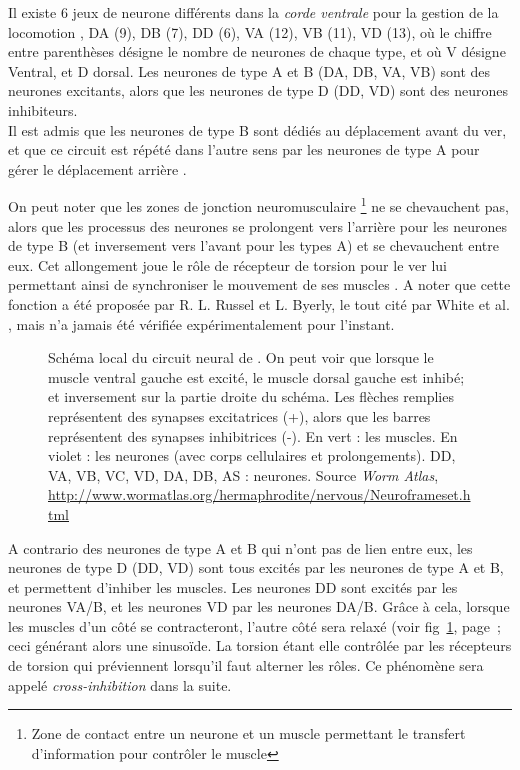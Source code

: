 Il existe 6 jeux de neurone différents dans la \textit{corde ventrale} pour la
gestion de la locomotion \cite{Boyle2009}, DA (9), DB (7), DD (6), VA (12), VB
(11), VD (13), où le chiffre entre parenthèses désigne le nombre de neurones de
chaque type, et où V désigne Ventral, et D dorsal.  Les neurones de type A et B
(DA, DB, VA, VB) sont des neurones excitants, alors que les neurones de type D
(DD, VD) sont des neurones inhibiteurs.\\


Il est admis que les neurones de type B sont dédiés au déplacement avant du ver,
et que ce circuit est répété dans l'autre sens par les neurones de type A
pour gérer le déplacement arrière \cite{AltunZ.F.andHall2011,Boyle2009,White1986}.

On peut noter que les zones de jonction neuromusculaire \footnote{Zone de
contact entre un neurone et un muscle permettant le transfert d'information 
pour contrôler le muscle} ne se chevauchent pas, alors que les processus
des neurones se prolongent vers l'arrière pour les neurones de type B (et
inversement vers l'avant pour les types A) et se chevauchent entre eux. Cet
allongement joue le rôle de récepteur de torsion pour le ver lui permettant
ainsi de synchroniser le mouvement de ses muscles \cite{Boyle2009}. A noter que
cette fonction a été proposée par R. L. Russel et L. Byerly, le tout cité par
White et al. \cite{White1986}, mais n'a jamais été vérifiée expérimentalement
pour l'instant.


\begin{figure}[ht]
   \begin{center}
   \end{center}
   \caption[Schéma local du circuit neural de \celeg{}]{Schéma local du circuit neural de \celeg{}. On peut voir
   que lorsque le muscle ventral gauche est excité, le muscle dorsal gauche est
   inhibé; et inversement sur la partie droite du schéma. Les flèches remplies
   représentent des synapses excitatrices (+), alors que les barres représentent des
   synapses inhibitrices (-). En vert : les muscles. En violet : les neurones (avec corps cellulaires et prolongements).
   DD, VA, VB, VC, VD, DA, DB, AS : neurones. Source \textit{Worm Atlas}\cite{AltunZ.F.andHall2011},
   \url{http://www.wormatlas.org/hermaphrodite/nervous/Neuroframeset.html}}
   \label{fig:alternance_dv}
\end{figure}

A contrario des neurones de type A et B qui n'ont pas de lien entre eux, les
neurones de type D (DD, VD) sont tous excités par les neurones de type A et B,
et permettent d'inhiber les muscles. Les neurones DD sont excités par les
neurones VA/B, et les neurones VD par les neurones DA/B. Grâce à cela, lorsque
les muscles d'un côté se contracteront, l'autre côté sera relaxé (voir
fig~\ref{fig:alternance_dv}, page~\pageref{fig:alternance_dv}; ceci générant
alors une sinusoïde. La torsion étant elle contrôlée par les récepteurs de
torsion qui préviennent lorsqu'il faut alterner les rôles. Ce phénomène sera
appelé \textit{cross-inhibition} dans la suite.\\


